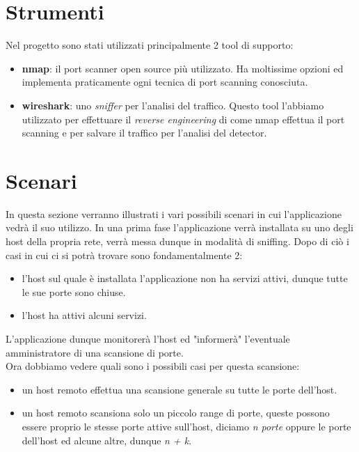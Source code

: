\documentclass[a4paper,12pt]{article} %
\begin{document}
\section{Strumenti}

Nel progetto sono stati utilizzati principalmente 2 tool di supporto:

\begin{itemize}

\item \textbf{nmap}: il port scanner open source più utilizzato. Ha moltissime opzioni ed implementa praticamente 
ogni tecnica di port scanning conosciuta.

\item \textbf{wireshark}: uno \emph{sniffer} per l'analisi del traffico. Questo tool l'abbiamo utilizzato per effettuare
il \emph{reverse engineering} di come nmap effettua il port scanning e per salvare il traffico per l'analisi del detector.



\end{itemize}




\section{Scenari}

In questa sezione verranno illustrati i vari possibili scenari in cui l'applicazione vedrà il suo utilizzo. 
In una prima fase l'applicazione verrà installata su uno degli host della propria rete, verrà messa dunque in modalità di sniffing. 
Dopo di ciò i casi in cui ci si potrà trovare sono fondamentalmente 2:

\begin{itemize}

\item l'host sul quale è installata l'applicazione non ha servizi attivi, dunque tutte le sue porte sono chiuse.

\item l'host ha attivi alcuni servizi.

\end{itemize}


L'applicazione dunque monitorerà l'host ed "informerà" l'eventuale amministratore di una scansione di porte.\\
Ora dobbiamo vedere quali sono i possibili casi per questa scansione:


\begin{itemize}

\item un host remoto effettua una scansione generale su tutte le porte dell'host.

\item un host remoto scansiona solo un piccolo range di porte, queste possono essere proprio le stesse porte attive sull'host, diciamo 
\emph{n porte} oppure le porte dell'host ed alcune altre, dunque \emph{n + k}.

\end{itemize}
\end{document}
